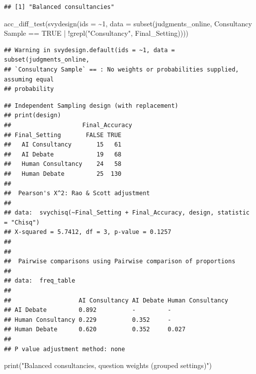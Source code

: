 \documentclass[
]{article}
\newenvironment{Shaded}{\begin{snugshade}}{\end{snugshade}}
\newcommand{\AttributeTok}[1]{\textcolor[rgb]{0.77,0.63,0.00}{#1}}
\newcommand{\ConstantTok}[1]{\textcolor[rgb]{0.00,0.00,0.00}{#1}}
\newcommand{\DecValTok}[1]{\textcolor[rgb]{0.00,0.00,0.81}{#1}}
\newcommand{\FunctionTok}[1]{\textcolor[rgb]{0.00,0.00,0.00}{#1}}
\newcommand{\NormalTok}[1]{#1}
\newcommand{\SpecialCharTok}[1]{\textcolor[rgb]{0.00,0.00,0.00}{#1}}
\newcommand{\StringTok}[1]{\textcolor[rgb]{0.31,0.60,0.02}{#1}}
\begin{document}
\begin{verbatim}
## [1] "Balanced consultancies"
\end{verbatim}

\begin{Shaded}
\begin{Highlighting}[]
\FunctionTok{acc\_diff\_test}\NormalTok{(}\FunctionTok{svydesign}\NormalTok{(}\AttributeTok{ids =} \SpecialCharTok{\textasciitilde{}}\DecValTok{1}\NormalTok{, }\AttributeTok{data =} \FunctionTok{subset}\NormalTok{(judgments\_online, }\StringTok{\textasciigrave{}}\AttributeTok{Consultancy Sample}\StringTok{\textasciigrave{}} \SpecialCharTok{==} \ConstantTok{TRUE} \SpecialCharTok{|} \SpecialCharTok{!}\FunctionTok{grepl}\NormalTok{(}\StringTok{"Consultancy"}\NormalTok{, Final\_Setting))))}
\end{Highlighting}
\end{Shaded}

\begin{verbatim}
## Warning in svydesign.default(ids = ~1, data = subset(judgments_online,
## `Consultancy Sample` == : No weights or probabilities supplied, assuming equal
## probability
\end{verbatim}

\begin{verbatim}
## Independent Sampling design (with replacement)
## print(design)
##                    Final_Accuracy
## Final_Setting       FALSE TRUE
##   AI Consultancy       15   61
##   AI Debate            19   68
##   Human Consultancy    24   58
##   Human Debate         25  130
## 
##  Pearson's X^2: Rao & Scott adjustment
## 
## data:  svychisq(~Final_Setting + Final_Accuracy, design, statistic = "Chisq")
## X-squared = 5.7412, df = 3, p-value = 0.1257
## 
## 
##  Pairwise comparisons using Pairwise comparison of proportions 
## 
## data:  freq_table 
## 
##                   AI Consultancy AI Debate Human Consultancy
## AI Debate         0.892          -         -                
## Human Consultancy 0.229          0.352     -                
## Human Debate      0.620          0.352     0.027            
## 
## P value adjustment method: none
\end{verbatim}

\begin{Shaded}
\begin{Highlighting}[]
\FunctionTok{print}\NormalTok{(}\StringTok{"Balanced consultancies, question weights (grouped settings)"}\NormalTok{)}
\end{Highlighting}
\end{Shaded}
\end{document}

